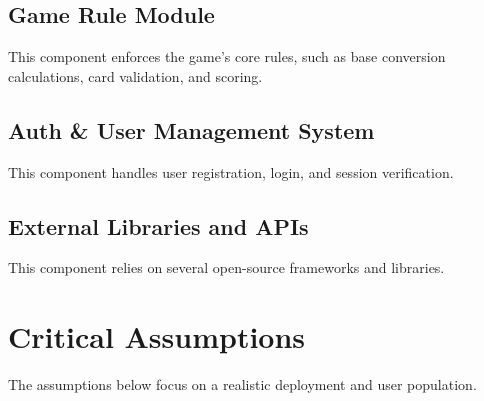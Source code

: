 \documentclass{article}
\begin{document}
\subsection{Game Rule Module}
This component enforces the game's core rules, such as base conversion calculations, card validation, and scoring.
\subsection{Auth \& User Management System}
This component handles user registration, login, and session verification.
\subsection{External Libraries and APIs}
This component relies on several open-source frameworks and libraries.

\section{Critical Assumptions}

The assumptions below focus on a realistic deployment and user population. 
\end{document}
